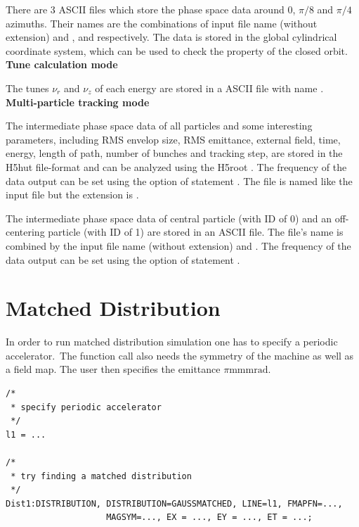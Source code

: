 There are 3 ASCII files which store the phase space data around $0$, $\pi/8$ and $\pi/4$ azimuths.
Their names are the combinations of input file name (without extension) and ,  and  respectively.
The data is stored in the global cylindrical coordinate system, which can be used to check the property of the closed orbit.\\

{\bfseries Tune calculation mode}

 The tunes $\nu_r$ and $\nu_z$ of each energy are stored in a ASCII file with name .\\

{\bfseries Multi-particle tracking mode}

The intermediate phase space data of all particles and some interesting parameters,
including RMS envelop size, RMS emittance, external field, time, energy, length of path, number of bunches and
tracking step, are stored in the H5hut file-format \cite{bib:howison2010} and can be analyzed
using the H5root \cite{bib:schietinger}.
The frequency of the data output can be set using the   option of  statement .
The file is named like the input file but the extension is .

The intermediate phase space data of central particle (with ID of 0) and an off-centering particle (with ID of 1)
are stored in an ASCII file. The file's name is combined by the input file name (without extension) and .
The frequency of the data output can be set using the  option of  statement .



\section{Matched Distribution}
In order to run matched distribution simulation one has to specify a periodic accelerator.\ The function call also needs
the symmetry of the machine as well as a field map. The user then specifies the emittance $\pi\si{\milli\meter\milli\radian}$.
\begin{verbatim}
/*
 * specify periodic accelerator
 */
l1 = ...

/*
 * try finding a matched distribution
 */
Dist1:DISTRIBUTION, DISTRIBUTION=GAUSSMATCHED, LINE=l1, FMAPFN=...,
                    MAGSYM=..., EX = ..., EY = ..., ET = ...;
\end{verbatim}
